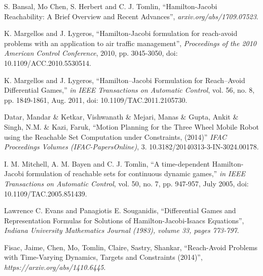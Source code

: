 \begin{thebibliography}{1}


S. Bansal, Mo Chen, S. Herbert and C. J. Tomlin, ``Hamilton-Jacobi Reachability: A Brief Overview and Recent Advances'',
\emph{arxiv.org/abs/1709.07523}.

K. Margellos and J. Lygeros, ``Hamilton-Jacobi formulation for reach-avoid problems with an application to air traffic management'',
\emph{Proceedings of the 2010 American Control Conference}, 2010, pp. 3045-3050, doi: 10.1109/ACC.2010.5530514.

K. Margellos and J. Lygeros, ``Hamilton–Jacobi Formulation for Reach–Avoid Differential Games,''
\emph{in IEEE Transactions on Automatic Control}, vol. 56, no. 8, pp. 1849-1861, Aug. 2011, doi: 10.1109/TAC.2011.2105730.

Datar, Mandar \& Ketkar, Vishwanath \& Mejari, Manas \& Gupta, Ankit \& Singh, N.M. \& Kazi, Faruk, ``Motion Planning for the Three Wheel Mobile Robot using the Reachable Set Computation under Constraints, (2014)''
\emph{IFAC Proceedings Volumes (IFAC-PapersOnline)}, 3. 10.3182/20140313-3-IN-3024.00178.

I. M. Mitchell, A. M. Bayen and C. J. Tomlin, ``A time-dependent Hamilton-Jacobi formulation of reachable sets for continuous dynamic games,''
\emph{in IEEE Transactions on Automatic Control}, vol. 50, no. 7, pp. 947-957, July 2005, doi: 10.1109/TAC.2005.851439.

Lawrence C. Evans and Panagiotis E. Souganidis, ``Differential Games and Representation Formulas for Solutions of Hamilton-Jacobi-Isaacs Equations'',
\emph{Indiana University Mathematics Journal (1983), volume 33, pages 773-797}.

Fisac, Jaime, Chen, Mo, Tomlin, Claire, Sastry, Shankar, ``Reach-Avoid Problems with Time-Varying Dynamics, Targets and Constraints (2014)'',
\emph{https://arxiv.org/abs/1410.6445}.

\end{thebibliography}
